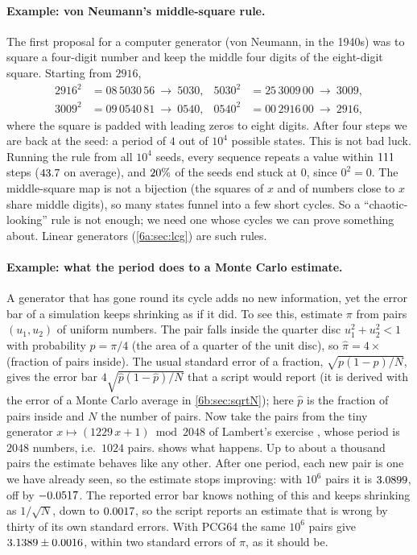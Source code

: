 \paragraph{Example: von Neumann's middle-square rule.}
The first proposal for a computer generator (von Neumann, in the 1940s) was to
square a four-digit number and keep the middle four digits of the eight-digit
square. Starting from $2916$,
\begin{align*}
  2916^2&=08\,5030\,56\ \to\ 5030, &
  5030^2&=25\,3009\,00\ \to\ 3009,\\
  3009^2&=09\,0540\,81\ \to\ 0540, &
  0540^2&=00\,2916\,00\ \to\ 2916 ,
\end{align*}
where the square is padded with leading zeros to eight digits. After four steps we
are back at the seed: a period of $4$ out of $10^4$ possible states. This is not
bad luck. Running the rule from all $10^4$ seeds, every sequence repeats a value
within $111$ steps ($43.7$ on average), and
$20\%$ of the seeds end stuck at $0$, since $0^2=0$. The
middle-square map is not a bijection (the squares of $x$ and of numbers close to
$x$ share middle digits), so many states funnel into a few short cycles. So a
``chaotic-looking'' rule is not enough; we need one whose cycles we can prove
something about. Linear generators (\cref{6a:sec:lcg}) are such rules.

\paragraph{Example: what the period does to a Monte Carlo estimate.}
A generator that has gone round its cycle adds no new information, yet the error
bar of a simulation keeps shrinking as if it did. To see this, estimate $\pi$ from
pairs $(u_1,u_2)$ of uniform numbers. The pair falls inside
the quarter disc $u_1^2+u_2^2<1$ with probability $p=\pi/4$ (the area of a
quarter of the unit disc), so $\hat\pi=4\times$(fraction of pairs inside). The
usual standard error of a fraction, $\sqrt{p(1-p)/N}$, gives the error bar
$4\sqrt{\hat p(1-\hat p)/N}$ that a script would report (it is derived with the
error of a Monte Carlo average in \cref{6b:sec:sqrtN}); here $\hat p$ is the
fraction of pairs inside and $N$ the number of pairs. Now take the pairs from the tiny generator
$x\mapsto(1229\,x+1)\bmod 2048$ of Lambert's exercise
, whose period is $2048$ numbers, i.e.\ $1024$
pairs.  shows what happens. Up to about a thousand pairs
the estimate behaves like any other. After one period, each new pair is one we
have already seen, so the estimate stops improving: with $10^6$ pairs it is
$3.0899$, off by $-0.0517$. The reported error bar knows nothing of
this and keeps shrinking as $1/\sqrt N$, down to $0.0017$, so the script
reports an estimate that is wrong by thirty of its own standard errors. With
PCG64 the same $10^6$ pairs give $3.1389\pm0.0016$, within two
standard errors of $\pi$, as it should be.

